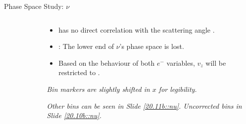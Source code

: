 \begin{frame}{Phase Space Study: $\nu$}
    \label{12.13::nu}

    \begin{columns}[onlytextwidth,T]

    \begin{column}{.48\linewidth}
        \vspace{-15pt}
        \begin{center}
            \begin{figure}[t]
            \end{figure}
        \end{center}
    \end{column}

    \begin{column}{.50\linewidth}
        \begin{itemize}
            \item
                \ef{$\nu$} has no direct correlation with the scattering angle .

            \vspace{12pt}
            \item
                : The lower end of $\nu$'s phase space is lost.

            \vspace{12pt}
            \item
                Based on the behaviour of both $e^-$ variables, $v_z$ will be restricted to .
        \end{itemize}

        \vspace{66pt}

        \begin{flushright}
            \tiny{\textit{Bin markers are slightly shifted in $x$ for legibility.}}

            \tiny{\textit{
                Other bins can be seen in Slide \textcolor{efd_purple}{\ref{20.11b::nu}}.
                Uncorrected bins in Slide \textcolor{efd_purple}{\ref{20.10b::nu}}.
            }}
        \end{flushright}
    \end{column}

    \end{columns}
\end{frame}


